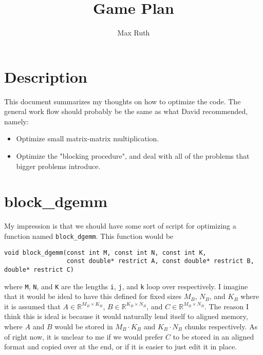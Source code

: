 \documentclass{article}
\title{Game Plan}
\author{Max Ruth}
\begin{document}
\maketitle

\section{Description}
	This document summarizes my thoughts on how to optimize the code. The general work flow should probably be the same as what David recommended, namely:
\begin{itemize}
	\item Optimize small matrix-matrix multiplication.
	\item Optimize the "blocking procedure", and deal with all of the problems that bigger problems introduce. 
\end{itemize}

\section{block\_dgemm}
My impression is that we should have some sort of script for optimizing a function named \texttt{block\_dgemm}. This function would be
\begin{verbatim}
void block_dgemm(const int M, const int N, const int K, 
                 const double* restrict A, const double* restrict B, double* restrict C)
\end{verbatim}
where \texttt{M}, \texttt{N}, and \texttt{K} are the lengths \texttt{i}, \texttt{j}, and \texttt{k} loop over respectively. I imagine that it would be ideal to have this defined for fixed sizes $M_B$, $N_B$, and $K_B$ where it is assumed that $A \in \mathbb{R}^{M_B \times K_B}$, $B \in \mathbb{R}^{K_B \times N_B}$, and $C \in \mathbb{R}^{M_B \times N_B}$. The reason I think this is ideal is because it would naturally lend itself to aligned memory, where $A$ and $B$ would be stored in $M_B \cdot K_B$ and $K_B \cdot N_B$ chunks respectively. As of right now, it is unclear to me if we would prefer $C$ to be stored in an aligned format and copied over at the end, or if it is easier to just edit it in place.
\end{document}
